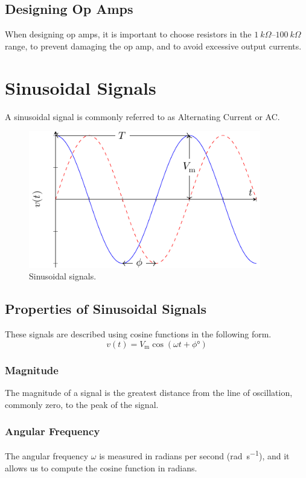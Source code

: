 \documentclass{article}
\begin{document}
\subsection{Designing Op Amps}
When designing op amps, it is important to choose resistors in the \(\qtyrange{1}{100}{k\Omega}\)
range, to prevent damaging the op amp, and to avoid excessive output currents.
\newpage
\section{Sinusoidal Signals}
\begin{definition}
    A sinusoidal signal is commonly referred to as Alternating Current or AC\@.
\end{definition}
\begin{figure}[H]
    \centering
    \includegraphics[height = 6cm, keepaspectratio = true]{figures/sinusoidal_signal.pdf}
    \caption{Sinusoidal signals.}
\end{figure}
\subsection{Properties of Sinusoidal Signals}
These signals are described using cosine functions in the following form.
\begin{equation*}
    v(t) = V_{\mathrm{m}} \cos{\left( \omega t + \phi\unit{\degree} \right)}
\end{equation*}
\subsubsection{Magnitude}
\begin{definition}
    The magnitude of a signal is the greatest distance from the line of oscillation, commonly zero,
    to the peak of the signal.
\end{definition}
\subsubsection{Angular Frequency}
\begin{definition}
    The angular frequency \(\omega\) is measured in radians per second (\unit{\radian.\second^{-1}}), and it allows
    us to compute the cosine function in radians.
\end{definition}
\end{document}

